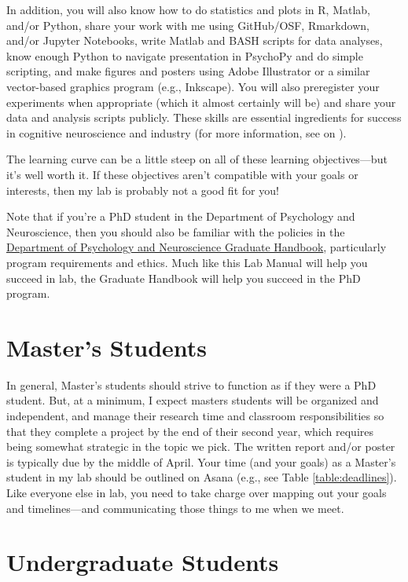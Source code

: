 \documentclass[letterpaper,11pt,oneside]{memoir}
\begin{document}
In addition, you will also know how to do statistics and plots in R, Matlab, and/or Python, share your work with me using GitHub/OSF, Rmarkdown, and/or Jupyter Notebooks, write Matlab and BASH scripts for data analyses, know enough Python to navigate presentation in PsychoPy and do simple scripting, and make figures and posters using Adobe Illustrator or a similar vector-based graphics program (e.g., Inkscape). You will also preregister your experiments when appropriate (which it almost certainly will be) and share your data and analysis scripts publicly. These skills are essential ingredients for success in cognitive neuroscience and industry (for more information, see  on ).

The learning curve can be a little steep on all of these learning objectives---but it's well worth it. If these objectives aren't compatible with your goals or interests, then my lab is probably not a good fit for you!

Note that if you're a PhD student in the Department of Psychology and Neuroscience, then you should also be familiar with the policies in the \href{https://docs.google.com/document/d/1hoxVN1ol7ZGB10_9N0k8yVxkRDJLcMVYGTp-Nwgbm94/edit}{Department of Psychology and Neuroscience Graduate Handbook}, particularly program requirements and ethics. Much like this Lab Manual will help you succeed in lab, the Graduate Handbook will help you succeed in the PhD program.


\section{Master's Students}

In general, Master's students should strive to function as if they were a PhD student. But, at a minimum, I expect masters students will be organized and independent, and manage their research time and classroom responsibilities so that they complete a project by the end of their second year, which requires being somewhat strategic in the topic we pick. The written report and/or poster is typically due by the middle of April. Your time (and your goals) as a Master's student in my lab should be outlined on Asana (e.g., see Table \ref{table:deadlines}). Like everyone else in lab, you need to take charge over mapping out your goals and timelines---and communicating those things to me when we meet.

\section{Undergraduate Students}
\end{document}
